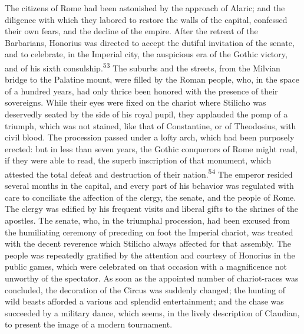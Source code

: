 The citizens of Rome had been astonished by the approach of
Alaric; and the diligence with which they labored to restore the
walls of the capital, confessed their own fears, and the decline
of the empire. After the retreat of the Barbarians, Honorius was
directed to accept the dutiful invitation of the senate, and to
celebrate, in the Imperial city, the auspicious era of the
Gothic victory, and of his sixth consulship.\textsuperscript{53} The suburbs and
the streets, from the Milvian bridge to the Palatine mount, were
filled by the Roman people, who, in the space of a hundred years,
had only thrice been honored with the presence of their
sovereigns. While their eyes were fixed on the chariot where
Stilicho was deservedly seated by the side of his royal pupil,
they applauded the pomp of a triumph, which was not stained, like
that of Constantine, or of Theodosius, with civil blood. The
procession passed under a lofty arch, which had been purposely
erected: but in less than seven years, the Gothic conquerors of
Rome might read, if they were able to read, the superb
inscription of that monument, which attested the total defeat and
destruction of their nation.\textsuperscript{54} The emperor resided several
months in the capital, and every part of his behavior was
regulated with care to conciliate the affection of the clergy,
the senate, and the people of Rome. The clergy was edified by his
frequent visits and liberal gifts to the shrines of the apostles.
The senate, who, in the triumphal procession, had been excused
from the humiliating ceremony of preceding on foot the Imperial
chariot, was treated with the decent reverence which Stilicho
always affected for that assembly. The people was repeatedly
gratified by the attention and courtesy of Honorius in the public
games, which were celebrated on that occasion with a magnificence
not unworthy of the spectator. As soon as the appointed number of
chariot-races was concluded, the decoration of the Circus was
suddenly changed; the hunting of wild beasts afforded a various
and splendid entertainment; and the chase was succeeded by a
military dance, which seems, in the lively description of
Claudian, to present the image of a modern tournament.



